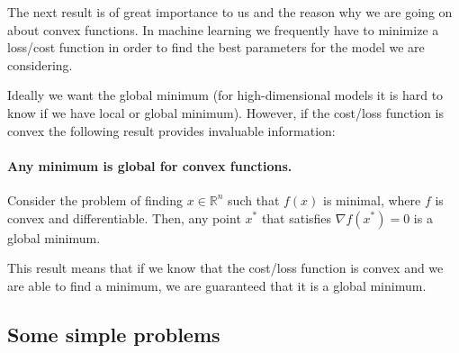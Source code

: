 \documentclass[%
oneside,                 %
final,                   %
10pt]{article}
\begin{document}
The next result is of great importance to us and the reason why we are
going on about convex functions. In machine learning we frequently
have to minimize a loss/cost function in order to find the best
parameters for the model we are considering. 

Ideally we want the
global minimum (for high-dimensional models it is hard to know
if we have local or global minimum). However, if the cost/loss function
is convex the following result provides invaluable information:


\paragraph{Any minimum is global for convex functions.}
Consider the problem of finding $x \in \mathbb{R}^n$ such that $f(x)$
is minimal, where $f$ is convex and differentiable. Then, any point
$x^*$ that satisfies $\nabla f(x^*) = 0$ is a global minimum.



This result means that if we know that the cost/loss function is convex and we are able to find a minimum, we are guaranteed that it is a global minimum.

\subsection*{Some simple problems}
\end{document}
